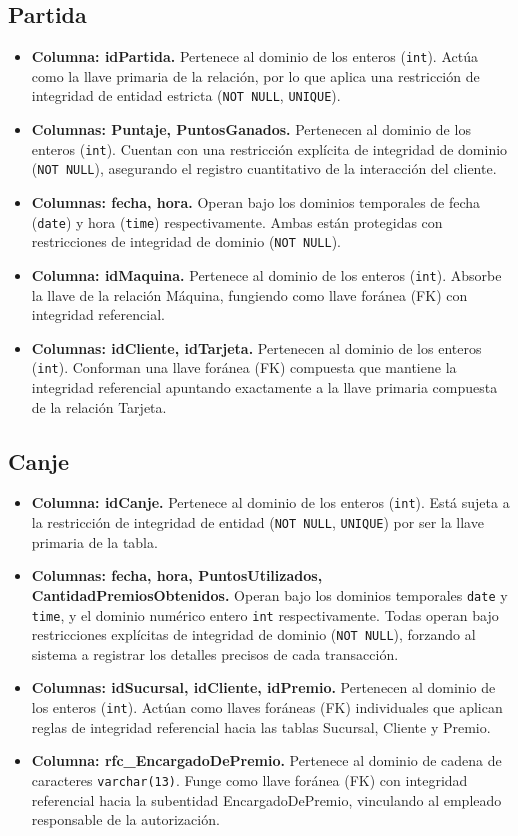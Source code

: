 \documentclass[11pt,letterpaper,spanish]{article}
\begin{document}
\subsection*{Partida}
\begin{itemize}
	\item \textbf{Columna: idPartida.} Pertenece al dominio de los enteros (\texttt{int}). Actúa como la llave primaria de la relación, por lo que aplica una restricción de integridad de entidad estricta (\texttt{NOT NULL}, \texttt{UNIQUE}).
	\item \textbf{Columnas: Puntaje, PuntosGanados.} Pertenecen al dominio de los enteros (\texttt{int}). Cuentan con una restricción explícita de integridad de dominio (\texttt{NOT NULL}), asegurando el registro cuantitativo de la interacción del cliente.
	\item \textbf{Columnas: fecha, hora.} Operan bajo los dominios temporales de fecha (\texttt{date}) y hora (\texttt{time}) respectivamente. Ambas están protegidas con restricciones de integridad de dominio (\texttt{NOT NULL}).
	\item \textbf{Columna: idMaquina.} Pertenece al dominio de los enteros (\texttt{int}). Absorbe la llave de la relación Máquina, fungiendo como llave foránea (FK) con integridad referencial.
	\item \textbf{Columnas: idCliente, idTarjeta.} Pertenecen al dominio de los enteros (\texttt{int}). Conforman una llave foránea (FK) compuesta que mantiene la integridad referencial apuntando exactamente a la llave primaria compuesta de la relación Tarjeta.
\end{itemize}

\subsection*{Canje}
\begin{itemize}
	\item \textbf{Columna: idCanje.} Pertenece al dominio de los enteros (\texttt{int}). Está sujeta a la restricción de integridad de entidad (\texttt{NOT NULL}, \texttt{UNIQUE}) por ser la llave primaria de la tabla.
	\item \textbf{Columnas: fecha, hora, PuntosUtilizados, CantidadPremiosObtenidos.} Operan bajo los dominios temporales \texttt{date} y \texttt{time}, y el dominio numérico entero \texttt{int} respectivamente. Todas operan bajo restricciones explícitas de integridad de dominio (\texttt{NOT NULL}), forzando al sistema a registrar los detalles precisos de cada transacción.
	\item \textbf{Columnas: idSucursal, idCliente, idPremio.} Pertenecen al dominio de los enteros (\texttt{int}). Actúan como llaves foráneas (FK) individuales que aplican reglas de integridad referencial hacia las tablas Sucursal, Cliente y Premio.
	\item \textbf{Columna: rfc\_EncargadoDePremio.} Pertenece al dominio de cadena de caracteres \texttt{varchar(13)}. Funge como llave foránea (FK) con integridad referencial hacia la subentidad EncargadoDePremio, vinculando al empleado responsable de la autorización.
\end{itemize}
\end{document}
